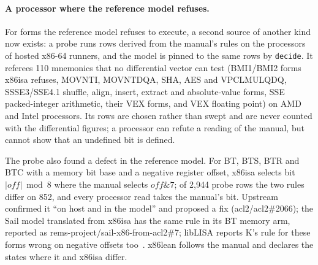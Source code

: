 \documentclass[runningheads]{llncs}
\newcommand{\src}[1]{}  %
\newcommand{\lean}[1]{\texttt{#1}}
\begin{document}
\paragraph{A processor where the reference model refuses.}
For forms the reference model refuses to execute, a second source of another kind now exists: a probe
runs rows derived from the manual's rules on the processors of hosted x86-64 runners, and the model is
pinned to the same rows by \lean{decide}. It referees 110 mnemonics that no differential vector can test
(BMI1/BMI2 forms x86isa refuses, MOVNTI, MOVNTDQA, SHA, AES and VPCLMULQDQ, SSSE3/SSE4.1 shuffle, align,
insert, extract and absolute-value forms, SSE packed-integer arithmetic, their VEX forms, and VEX floating point) on AMD and Intel processors. Its rows are chosen rather than swept and are never counted with the differential
figures; a processor can refute a reading of the manual, but cannot show that an undefined bit is defined.
\src{docs/CLAIMS.tsv[silicon\_mnemonics]; X86/Coverage.lean siliconTable; hwprobe/; docs/DECISIONS.md D330, D334--D336}
The probe also found a defect in the reference model. For BT, BTS, BTR and BTC with a memory bit base and
a negative register offset, x86isa selects bit $|\mathit{off}| \bmod 8$ where the manual selects
$\mathit{off} \mathbin{\&} 7$; of 2{,}944 probe rows the two rules differ on 852, and every processor read
takes the manual's bit. Upstream confirmed it ``on host and in the model'' and proposed a fix
(acl2/acl2\#2066); the Sail model translated from x86isa has the same rule in its BT memory arm, reported
as rems-project/sail-x86-from-acl2\#7; libLISA reports K's rule for these forms wrong on negative offsets too~\cite{liblisa}. x86lean follows the manual and declares the states where it and x86isa differ.
\src{docs/CLAIMS.tsv[bitstr\_rows, bitstr\_rules\_differ]; docs/DECISIONS.md D331, D333; PROVENANCE.md;
https://github.com/acl2/acl2/issues/2066; https://github.com/rems-project/sail-x86-from-acl2/issues/7;
liblisa.nl/publications/liblisa-oopsla24/05-results section 5.2.2, the BT/BTS/BTR/BTC entry (byte offset zero-extended, 8 variants), read 2026-10-14}
\end{document}
